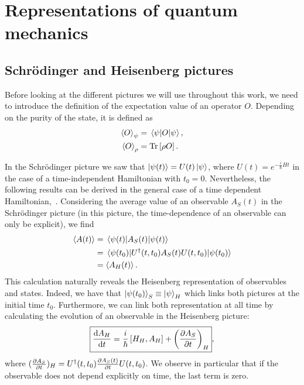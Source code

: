 \appendix
\setlength{\parskip}{2mm}\setlength{\parindent}{6mm}
\renewcommand{\thesubsection}{\thesection.\alph{subsection}\char41}
\renewcommand{\theequation}{\thechapter.~\arabic{equation}}
\chapter{Representations of quantum mechanics}\label{ann:pictures}
\section{Schrödinger and Heisenberg pictures}
Before looking at the different pictures we will use throughout this work, we need to introduce the definition of the expectation value of an operator $O$. Depending on the purity of the state, it is defined as
\begin{align*}
    \expval{O}_\psi&=\expval{O}{\psi},\\
    \expval{O}_\rho&=\operatorname{Tr}\left[\rho O\right].
\end{align*}

In the Schrödinger picture we saw that $\ket{\psi(t)}=U(t)\ket{\psi}$, where $U(t)=e^{-\frac{i}{\hbar}Ht}$ in the case of a time-independent Hamiltonian with $t_0=0$. Nevertheless, the following results can be derived in the general case of a time dependent Hamiltonian,~\cite{Breuer}. Considering the average value of an observable $A_S(t)$ in the Schrödinger picture (in this picture, the time-dependence of an observable can only be explicit), we find
\begin{align}
    \expval{A(t)} &= \expval{A_S(t)}{\psi(t)}\nonumber\\
    &= \expval{U^\dagger(t,t_0)A_S(t)U(t,t_0)}{\psi(t_0)}\\
    &= \expval{A_H(t)}.
\end{align}
This calculation naturally reveals the Heisenberg representation of observables and states. Indeed, we have that $\ket{\psi(t_0)}_S\equiv\ket{\psi}_H$ which links both pictures at the initial time $t_0$. Furthermore, we can link both representation at all time by calculating the evolution of an observable in the Heisenberg picture:
\begin{equation}
    \boxed{\frac{\mathrm{d}A_H}{\mathrm{d}t} = \frac{i}{\hbar}\left[H_{H},A_{H}\right] + \qty(\frac{\partial A_S}{\partial{}t})_H\label{eq:HSlink}},
\end{equation}
where $(\frac{\partial A_S}{\partial{}t})_H=U^\dagger(t,t_0)\frac{\partial A_S(t)}{\partial{}t}U(t,t_0)$. We observe in particular that if the observable does not depend explicitly on time, the last term is zero.

